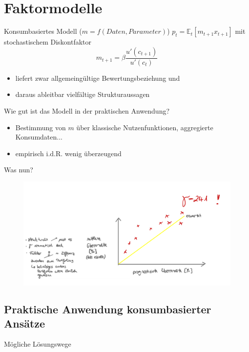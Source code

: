 \documentclass[12pt]{extreport} %
\theoremstyle{named}
\theoremstyle{nnamed}
\theoremstyle{itshape}
\theoremstyle{normal}
\begin{document}
\chapter{Faktormodelle}

Konsumbasiertes Modell ($m = f(Daten, Parameter)$) $p_t = \mathbb{E}_t\left[ m_{t+1} x_{t+1} \right]$ mit stochastischem Diskontfaktor
	$$ m_{t+1} = \beta \frac{u'(c_{t+1})}{u'(c_t)} $$
\begin{itemize}
	\item liefert zwar allgemeingültige Bewertungsbeziehung und
	\item daraus ableitbar vielfältige Strukturaussagen
\end{itemize}
Wie gut ist das Modell in der praktischen Anwendung?
\begin{itemize}
	\item Bestimmung von $m$ über klassische Nutzenfunktionen, aggregierte Konsumdaten...
	\item empirisch i.d.R. wenig überzeugend
\end{itemize}

Was nun?

\begin{figure}[h!] \centering
	\includegraphics[scale=0.5]{img/p77}
\end{figure}

\section*{Praktische Anwendung konsumbasierter Ansätze}

Mögliche Lösungswege
\end{document}
